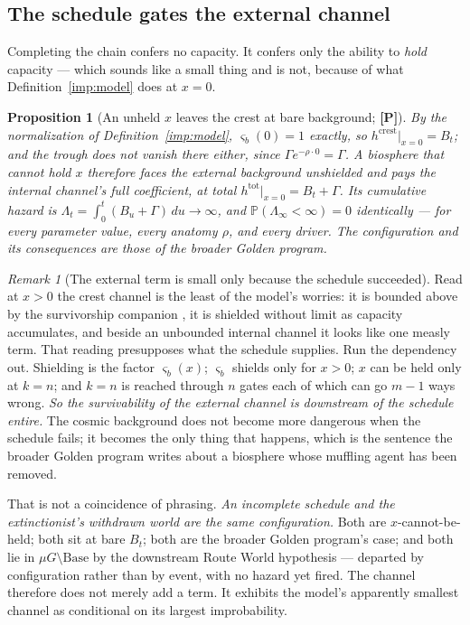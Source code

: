\documentclass[11pt]{article}
\newcommand{\PP}{\mathbb{P}}
\theoremstyle{plain}
\newtheorem{proposition}[theorem]{Proposition}
\theoremstyle{definition}
\theoremstyle{remark}
\newtheorem{remark}[theorem]{Remark}
\begin{document}
\subsection{The schedule gates the external channel}
\label{sch:subsub:gating}

Completing the chain confers no capacity. It confers only the ability to
\emph{hold} capacity --- which sounds like a small thing and is not,
because of what Definition~\ref{imp:model} does at $x=0$.

\begin{proposition}[An unheld $x$ leaves the crest at bare background;
\textbf{[P]}]\label{sch:prop:gating}
By the normalization of Definition~\ref{imp:model}, $\varsigma_b(0)=1$
exactly, so $h^{\mathrm{crest}}\big|_{x=0}=B_t$; and the trough does not
vanish there either, since $\Gamma e^{-\rho\cdot0}=\Gamma$. A biosphere
that cannot hold $x$ therefore faces the external background unshielded
\emph{and} pays the internal channel's full coefficient, at total
$h^{\mathrm{tot}}\big|_{x=0}=B_t+\Gamma$. Its cumulative hazard is
$\Lambda_t=\int_0^t(B_u+\Gamma)\,du\to\infty$, and
$\PP(\Lambda_\infty<\infty)=0$ identically --- for every parameter
value, every anatomy $\rho$, and every driver. The configuration and its
consequences are those of the broader Golden program.
\end{proposition}

\begin{remark}[The external term is small only because the schedule
succeeded]\label{sch:rem:reliance}
Read at $x>0$ the crest channel is the least of the model's worries: it
is bounded above by the survivorship companion \cite{SurvA}, it is shielded
without limit as capacity accumulates, and beside an unbounded internal
channel it looks like one measly term. That reading presupposes what the
schedule supplies. Run the dependency out. Shielding is the factor $\varsigma_b(x)$;
$\varsigma_b$ shields only for $x>0$; $x$ can be held only at $k=n$; and
$k=n$ is reached through $n$ gates each of which can go $m-1$ ways
wrong. \emph{So the survivability of the external channel is downstream
of the schedule entire.} The cosmic background does not become more
dangerous when the schedule fails; it becomes the only thing that
happens, which is the sentence the broader Golden program writes
about a biosphere whose muffling agent has been removed.

That is not a coincidence of phrasing. \emph{An incomplete schedule and
the extinctionist's withdrawn world are the same configuration.} Both
are $x$-cannot-be-held; both sit at bare $B_t$; both are
the broader Golden program's case; and both lie in
$\mu G\setminus\mathrm{Base}$ by the downstream Route World hypothesis --- departed
by configuration rather than by event, with no hazard yet fired. The
channel therefore does not merely add a term. It exhibits the model's
apparently smallest channel as conditional on its largest improbability.
\end{remark}
\end{document}
